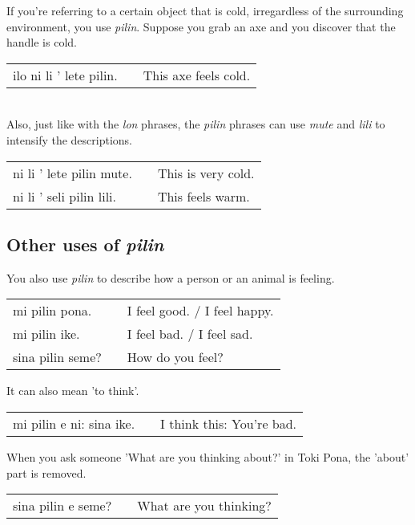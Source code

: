{If you're referring to a certain object that is cold, irregardless of the surrounding environment, you use \textit{pilin}.  
Suppose you grab an axe and you discover that the handle is cold. 

\begin{supertabular}{p{5,5cm}|ll}
ilo ni li ' lete pilin. && This axe feels cold. \\
\end{supertabular} \\

Also, just like with the \textit{lon} phrases, the \textit{pilin} phrases can use \textit{mute} and \textit{lili} to intensify the descriptions. 

\begin{supertabular}{p{5,5cm}|ll}
ni li ' lete pilin mute. && This is very cold. \\
ni li ' seli pilin lili. && This feels warm. \\
\end{supertabular} 
%
\subsection*{Other uses of \textit{pilin}}
%
You also use \textit{pilin} to describe how a person or an animal is feeling. 

\begin{supertabular}{p{5,5cm}|ll}
mi pilin pona. && I feel good. / I feel happy. \\
mi pilin ike. && I feel bad. / I feel sad. \\
sina pilin seme? && How do you feel? \\ 
\end{supertabular} 

It can also mean 'to think'.

\begin{supertabular}{p{5,5cm}|ll}
mi pilin e ni: sina ike. && I think this: You're bad. \\ 
\end{supertabular} 

When you ask someone 'What are you thinking about?' in Toki Pona, the 'about' part is removed. 

\begin{supertabular}{p{5,5cm}|ll}
sina pilin e seme? && What are you thinking? \\
\end{supertabular} 

}
